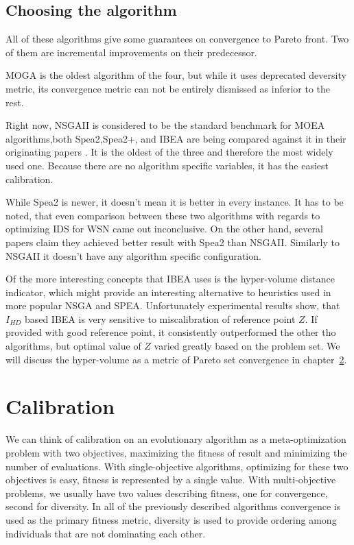 \documentclass[12pt,oneside]{fithesis2}
\begin{document}
\section{Choosing the algorithm}
All of these algorithms give some guarantees on convergence to Pareto front. Two of them are incremental improvements on their predecessor. 

MOGA is the oldest algorithm of the four, but while it uses deprecated deversity metric, its convergence metric can not be entirely dismissed as inferior to the rest.

Right now, NSGAII is considered to be the standard benchmark for MOEA algorithms,both Spea2,Spea2+, and IBEA are being compared against it in their originating papers . It is the oldest of the three and therefore the most widely used one. Because there are no algorithm specific variables, it has the easiest calibration.
       
While Spea2 is newer, it doesn't mean it is better in every instance. It has to be noted, that even comparison between these two algorithms with regards to optimizing IDS for WSN came out inconclusive.\cite{stehl2013opt} On the other hand, several papers claim they achieved better result with Spea2 than NSGAII. Similarly to NSGAII it doesn't have any algorithm specific configuration. 

Of the more interesting concepts that IBEA uses is the hyper-volume distance indicator, which might provide an interesting alternative to heuristics used in more popular NSGA and SPEA. Unfortunately experimental results show\cite{zitzler2004indicator}, that $I_{HD}$ based IBEA is very sensitive to miscalibration of reference point $Z$. If provided with good reference point, it consistently outperformed the other tho algorithms, but optimal value of $Z$ varied greatly based on the problem set. We will discuss the hyper-volume as a metric of Pareto set convergence in chapter~\ref{chap:calib}.

\chapter{Calibration}
\label{chap:calib}
We can think of calibration on an evolutionary algorithm as a meta-optimization problem with two objectives, maximizing the fitness of result and minimizing the number of evaluations.
With single-objective algorithms, optimizing for these two objectives is easy, fitness is represented by a single value.
With multi-objective problems, we usually have two values describing fitness, one for convergence, second for diversity. In all of the previously described algorithms convergence is used as the primary fitness metric, diversity is used to provide ordering among individuals that are not dominating each other.
\end{document}
